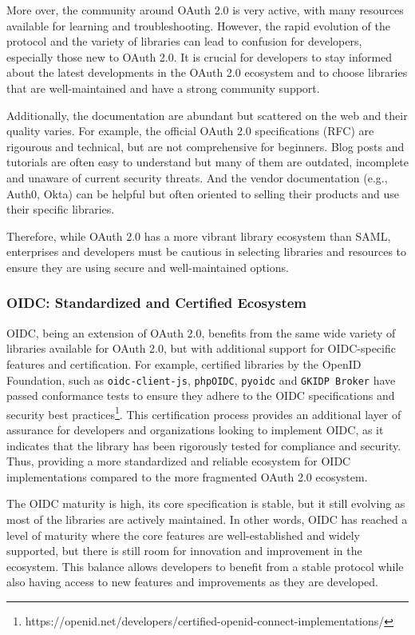 \documentclass[../memoire.tex]{subfiles}
\begin{document}
More over, the community around OAuth 2.0 is very active, with many resources available for learning and troubleshooting. However, the rapid evolution of the protocol and the variety of libraries can lead to confusion for developers, especially those new to OAuth 2.0. It is crucial for developers to stay informed about the latest developments in the OAuth 2.0 ecosystem and to choose libraries that are well-maintained and have a strong community support.

Additionally, the documentation are abundant but scattered on the web and their quality varies. For example, the official OAuth 2.0 specifications (RFC) are rigourous and technical, but are not comprehensive for beginners. Blog posts and tutorials are often easy to understand but many of them are outdated, incomplete and unaware of current security threats. And the vendor documentation (e.g., Auth0, Okta) can be helpful but often oriented to selling their products and use their specific libraries.

Therefore, while OAuth 2.0 has a more vibrant library ecosystem than SAML, enterprises and developers must be cautious in selecting libraries and resources to ensure they are using secure and well-maintained options.

\subsubsection{OIDC: Standardized and Certified Ecosystem}

OIDC, being an extension of OAuth 2.0, benefits from the same wide variety of libraries available for OAuth 2.0, but with additional support for OIDC-specific features and certification. For example, certified libraries by the OpenID Foundation, such as \texttt{oidc-client-js}, \texttt{phpOIDC}, \texttt{pyoidc} and \texttt{GKIDP Broker} have passed conformance tests to ensure they adhere to the OIDC specifications and security best practices\footnote{https://openid.net/developers/certified-openid-connect-implementations/}. This certification process provides an additional layer of assurance for developers and organizations looking to implement OIDC, as it indicates that the library has been rigorously tested for compliance and security. Thus, providing a more standardized and reliable ecosystem for OIDC implementations compared to the more fragmented OAuth 2.0 ecosystem. 

The OIDC maturity is high, its core specification is stable, but it still evolving as most of the libraries are actively maintained. In other words, OIDC has reached a level of maturity where the core features are well-established and widely supported, but there is still room for innovation and improvement in the ecosystem. This balance allows developers to benefit from a stable protocol while also having access to new features and improvements as they are developed. 
\end{document}
